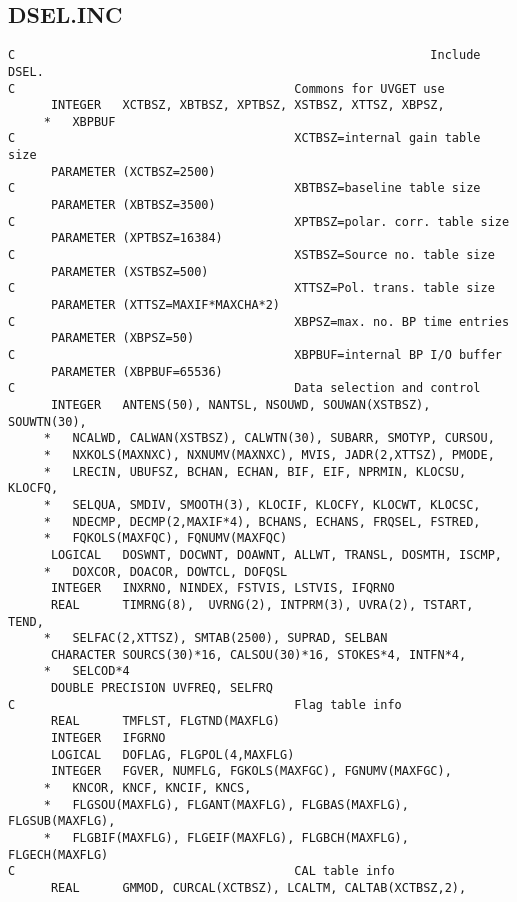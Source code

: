 \subsection{DSEL.INC}
\begin{verbatim}
C                                                          Include DSEL.
C                                       Commons for UVGET use
      INTEGER   XCTBSZ, XBTBSZ, XPTBSZ, XSTBSZ, XTTSZ, XBPSZ,
     *   XBPBUF
C                                       XCTBSZ=internal gain table size
      PARAMETER (XCTBSZ=2500)
C                                       XBTBSZ=baseline table size
      PARAMETER (XBTBSZ=3500)
C                                       XPTBSZ=polar. corr. table size
      PARAMETER (XPTBSZ=16384)
C                                       XSTBSZ=Source no. table size
      PARAMETER (XSTBSZ=500)
C                                       XTTSZ=Pol. trans. table size
      PARAMETER (XTTSZ=MAXIF*MAXCHA*2)
C                                       XBPSZ=max. no. BP time entries
      PARAMETER (XBPSZ=50)
C                                       XBPBUF=internal BP I/O buffer
      PARAMETER (XBPBUF=65536)
C                                       Data selection and control
      INTEGER   ANTENS(50), NANTSL, NSOUWD, SOUWAN(XSTBSZ), SOUWTN(30),
     *   NCALWD, CALWAN(XSTBSZ), CALWTN(30), SUBARR, SMOTYP, CURSOU,
     *   NXKOLS(MAXNXC), NXNUMV(MAXNXC), MVIS, JADR(2,XTTSZ), PMODE,
     *   LRECIN, UBUFSZ, BCHAN, ECHAN, BIF, EIF, NPRMIN, KLOCSU, KLOCFQ,
     *   SELQUA, SMDIV, SMOOTH(3), KLOCIF, KLOCFY, KLOCWT, KLOCSC,
     *   NDECMP, DECMP(2,MAXIF*4), BCHANS, ECHANS, FRQSEL, FSTRED,
     *   FQKOLS(MAXFQC), FQNUMV(MAXFQC)
      LOGICAL   DOSWNT, DOCWNT, DOAWNT, ALLWT, TRANSL, DOSMTH, ISCMP,
     *   DOXCOR, DOACOR, DOWTCL, DOFQSL
      INTEGER   INXRNO, NINDEX, FSTVIS, LSTVIS, IFQRNO
      REAL      TIMRNG(8),  UVRNG(2), INTPRM(3), UVRA(2), TSTART, TEND,
     *   SELFAC(2,XTTSZ), SMTAB(2500), SUPRAD, SELBAN
      CHARACTER SOURCS(30)*16, CALSOU(30)*16, STOKES*4, INTFN*4,
     *   SELCOD*4
      DOUBLE PRECISION UVFREQ, SELFRQ
C                                       Flag table info
      REAL      TMFLST, FLGTND(MAXFLG)
      INTEGER   IFGRNO
      LOGICAL   DOFLAG, FLGPOL(4,MAXFLG)
      INTEGER   FGVER, NUMFLG, FGKOLS(MAXFGC), FGNUMV(MAXFGC),
     *   KNCOR, KNCF, KNCIF, KNCS,
     *   FLGSOU(MAXFLG), FLGANT(MAXFLG), FLGBAS(MAXFLG), FLGSUB(MAXFLG),
     *   FLGBIF(MAXFLG), FLGEIF(MAXFLG), FLGBCH(MAXFLG), FLGECH(MAXFLG)
C                                       CAL table info
      REAL      GMMOD, CURCAL(XCTBSZ), LCALTM, CALTAB(XCTBSZ,2),

\end{verbatim}
